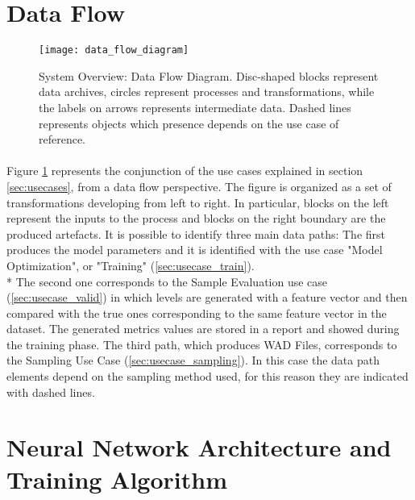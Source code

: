\newpage

\section{Data Flow}
\label{sec:dataflow}
\begin{figure}[h!]
	\begin{center}
		\texttt{[image: data\_flow\_diagram]}
	\end{center}
	
	\captionsetup{width=\linewidth}
	\caption[System Overview: Data Flow Diagram]{System Overview: Data Flow Diagram. Disc-shaped blocks represent data archives, circles represent processes and transformations, while the labels on arrows represents intermediate data. Dashed lines represents objects which presence depends on the use case of reference.}
	\label{fig:dataflow}
\end{figure}

\paragraph{} Figure \ref{fig:dataflow} represents the conjunction of the use cases explained in section \ref{sec:usecases}, from a data flow perspective.  The figure is organized as a set of transformations developing from left to right. In particular, blocks on the left represent the inputs to the process and blocks on the right boundary are the produced artefacts. 
It is possible to identify three main data paths: The first produces the model parameters and it is identified with the use case "Model Optimization", or "Training" (\ref{sec:usecase_train}). \\* The second one corresponds to the Sample Evaluation use case (\ref{sec:usecase_valid}) in which levels are generated with a feature vector and then compared with the true ones corresponding to the same feature vector in the dataset. The generated metrics values are stored in a report and showed during the training phase.
The third path, which produces WAD Files, corresponds to the Sampling Use Case (\ref{sec:usecase_sampling}). In this case the data path elements depend on the sampling method used, for this reason they are indicated with dashed lines.

\newpage

\section{Neural Network Architecture and Training Algorithm}
\label{sec:nn}

